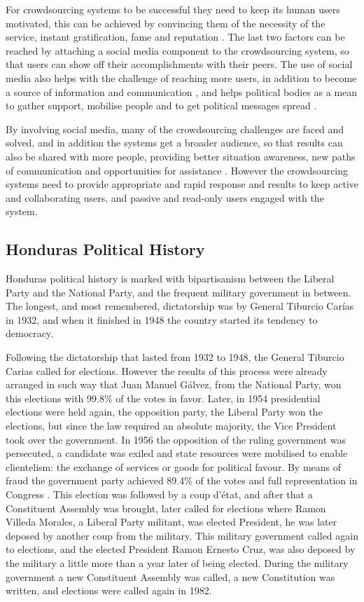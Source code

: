 \documentclass[letterpaper,10pt]{article}
\begin{document}
For crowdsourcing systems to be successful they need to keep its human users motivated, this can be achieved by convincing them of the necessity of the service, instant gratification, fame and reputation \citep{doan2011}. The last two factors can be reached by attaching a social media component to the crowdsourcing system, so that users can show off their accomplishments with their peers. The use of social media also helps with the challenge of reaching more users, in addition to become a source of information and communication \citep{yin2012}, and helps political bodies as a mean to gather support, mobilise people and to get political messages spread \citep{map2014}.

By involving social media, many of the crowdsourcing challenges are faced and solved, and in addition the systems get a broader audience, so that results can also be shared with more people, providing better situation awareness, new paths of communication and opportunities for assistance \citep{gao2011}. However the crowdsourcing systems need to provide appropriate and rapid response and results to keep active and collaborating users, and passive and read-only users engaged with the system.


\subsection{Honduras Political History}

Honduras political history is marked with bipartisanism between the Liberal Party and the National Party, and the frequent military government in between. The longest, and most remembered, dictatorship was by General Tiburcio Carías in 1932, and when it finished in 1948 the country started its tendency to democracy.

Following the dictatorship that lasted from 1932 to 1948, the General Tiburcio Carias called for elections. However the results of this process were already arranged in such way that Juan Manuel Gálvez, from the National Party, won this elections with 99.8\% of the votes in favor. Later, in 1954 presidential elections were held again, the opposition party, the Liberal Party won the elections, but since the law required an absolute majority, the Vice President took over the government. In 1956 the opposition of the ruling government was persecuted, a candidate was exiled and state resources were mobilised to enable clientelism: the exchange of services or goods for political favour. By means of fraud the government party achieved 89.4\% of the votes and full representation in Congress \citep{romero2014}. This election was followed by a coup d'\'{e}tat, and after that a Constituent Assembly was brought, later called for elections where Ramon Villeda Morales, a Liberal Party militant, was elected President, he was later deposed by another coup from the military. This military government called again to elections, and the elected President Ramon Ernesto Cruz, was also deposed by the military a little more than a year later of being elected. During the military government a new Constituent Assembly was called, a new Constitution was written, and elections were called again in 1982.
\end{document}
